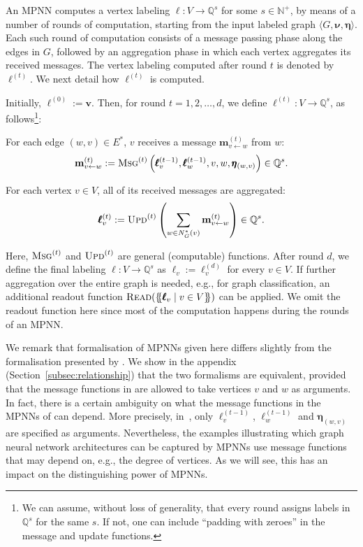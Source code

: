 \documentclass[10pt,a4paper]{article}
\theoremstyle{definition}
\newcommand*{\lmset}{\{\mskip-5mu\{}
\newcommand*{\rmset}{\}\mskip-5mu\}}
\begin{document}
An MPNN computes a vertex labeling $\pmb{\ell}:V\to \mathbb{Q}^{s}$ for some $s\in\mathbb{N}^+$, by means of a number of rounds of computation, starting from the input labeled graph $\langle G,\pmb{\nu},\pmb{\eta}\rangle$.
Each such round of computation consists of a message passing phase along the edges in $G$, followed by an aggregation phase in which each vertex aggregates its received messages. The vertex labeling computed after round $t$ is denoted by $\pmb{\ell}^{(t)}$. We next detail how $\pmb{\ell}^{(t)}$ is computed.

Initially, $\pmb{\ell}^{(0)}:=\pmb{v}$. Then, for round $t=1,2,\ldots,d$, we define $\pmb{\ell}^{(t)}:V\to\mathbb{Q}^{s}$, as follows\footnote{We can assume, without loss of generality, that every round assigns labels in $\mathbb{Q}^s$ for the same $s$. If not, one can include ``padding with zeroes'' in the message and update functions.}:
\begin{description}\setlength{\itemsep}{-0.4ex}
\item  [Message passing.] For each edge $(w,v)\in E^*$, $v$ receives a message $\mathbf{m}_{v\gets w}^{(t)}$ from $w$:
$$
\mathbf{m}^{(t)}_{v\gets w}:=\textsc{Msg}^{(t)}\left(\pmb{\ell}^{(t-1)}_v,\pmb{\ell}^{(t-1)}_w,v,w,\pmb{\eta}_{(w,v)}\right)\in\mathbb{Q}^{s}.
$$
\item [Aggregation.] For each vertex $v\in V$, all of its received messages are aggregated:
$$
\pmb{\ell}^{(t)}_v:=\textsc{Upd}^{(t)}\left(\sum_{w\in N_G^*(v)} \mathbf{m}_{v\gets w}^{(t)}\right)\in\mathbb{Q}^{s}.
$$
\end{description}
Here, $\textsc{Msg}^{(t)}$ and $\textsc{Upd}^{(t)}$ are general (computable) functions.
After round $d$, we define the final labeling $\pmb{\ell}:V\to\mathbb{Q}^{s}$ as  $\pmb{\ell}_v:=\pmb{\ell}^{(d)}_v$ for every $v\in V$. If further aggregation over the entire graph is needed, e.g., for graph classification, an additional readout function 
$\textsc{Read}(\lmset \pmb{\ell}_v\mid v\in V\rmset)$ can be applied. We omit the readout function here since most of the computation happens during the rounds of an MPNN.

We remark that formalisation of MPNNs given here differs slightly from the formalisation presented by \citet{GilmerSRVD17}. We show in the appendix (Section~\ref{subsec:relationship}) that the two formalisms are equivalent, provided that the message functions in \citet{GilmerSRVD17} are allowed to take vertices $v$ and $w$ as arguments. In fact, there is a certain ambiguity on what the message functions in the MPNNs of \citet{GilmerSRVD17} can depend. More precisely, in~\citep{GilmerSRVD17}, only $\pmb{\ell}_v^{(t-1)}$, $\pmb{\ell}_w^{(t-1)}$ and $\pmb{\eta}_{(w,v)}$ are specified as arguments. Nevertheless, the examples illustrating which graph neural network architectures can be captured by MPNNs use message functions that may depend on, e.g., the degree  of vertices. As we will see, this has an impact on the distinguishing power of MPNNs.
\end{document}
